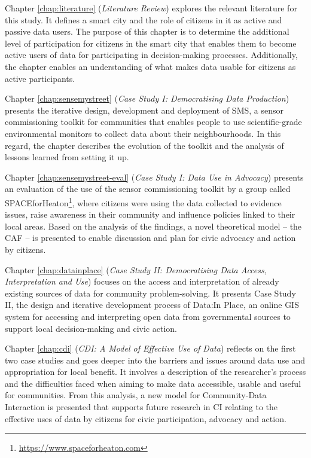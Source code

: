 \begin{introduction}
\noindent
Chapter \ref{chap:literature} (\textit{Literature Review}) explores the relevant literature for this study. It defines a smart city and the role of citizens in it as active and passive data users. The purpose of this chapter is to determine the additional level of participation for citizens in the smart city that enables them to become active users of data for participating in decision-making processes. Additionally, the chapter enables an understanding of what makes data usable for citizens as active participants.
\newline

\noindent
Chapter \ref{chap:sensemystreet} (\textit{Case Study I: Democratising Data Production}) presents the iterative design, development and deployment of SMS, a sensor commissioning toolkit for communities that enables people to use scientific-grade environmental monitors to collect data about their neighbourhoods. In this regard, the chapter describes the evolution of the toolkit and the analysis of lessons learned from setting it up.
\newline

\noindent
Chapter \ref{chap:sensemystreet-eval} (\textit{Case Study I: Data Use in Advocacy}) presents an evaluation of the use of the sensor commissioning toolkit by a group called SPACEforHeaton\footnote{\url{https://www.spaceforheaton.com}}, where citizens were using the data collected to evidence issues, raise awareness in their community and influence policies linked to their local areas. Based on the analysis of the findings, a novel theoretical model -- the CAF -- is presented to enable discussion and plan for civic advocacy and action by citizens.
\newline

\noindent
Chapter \ref{chap:datainplace} (\textit{Case Study II: Democratising Data Access, Interpretation and Use}) focuses on the access and interpretation of already existing sources of data for community problem-solving. It presents Case Study II, the design and iterative development process of Data:In Place, an online GIS system for accessing and interpreting open data from governmental sources to support local decision-making and civic action.
\newline

\noindent
Chapter \ref{chap:cdi} (\textit{CDI: A Model of Effective Use of Data}) reflects on the first two case studies and goes deeper into the barriers and issues around data use and appropriation for local benefit. It involves a description of the researcher's process and the difficulties faced when aiming to make data accessible, usable and useful for communities. From this analysis, a new model for Community-Data Interaction is presented that supports future research in CI relating to the effective uses of data by citizens for civic participation, advocacy and action.
\newline


\end{introduction}
